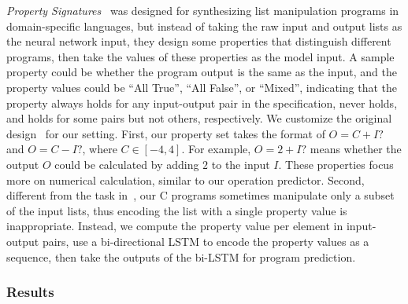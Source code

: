 \emph{Property Signatures}~\cite{odena2020learning} was designed for synthesizing list manipulation programs in domain-specific languages, but instead of taking the raw input and output lists as the neural network input, they design some properties that distinguish different programs, then take the values of these properties as the model input. A sample property could be whether the program output is the same as the input, and the property values could be ``All True'', ``All False'', or ``Mixed'', indicating that the property always holds for any input-output pair in the specification, never holds, and holds for some pairs but not others, respectively. We customize the original design~\cite{odena2020learning} for our setting. First, our property set takes the format of $O = C + I?$ and $O = C - I?$, where $C \in [-4, 4]$. For example, $O = 2 + I?$ means whether the output $O$ could be calculated by adding $2$ to the input $I$. These properties focus more on numerical calculation, similar to our operation predictor. Second, different from the task in~\cite{odena2020learning}, our C programs sometimes manipulate only a subset of the input lists, thus encoding the list with a single property value is inappropriate. Instead, we compute the property value per element in input-output pairs, use a bi-directional LSTM to encode the property values as a sequence, then take the outputs of the bi-LSTM for program prediction.

\subsubsection{Results}

